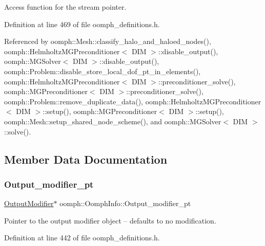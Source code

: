 Access function for the stream pointer. 



Definition at line 469 of file oomph\+\_\+definitions.\+h.



Referenced by oomph\+::\+Mesh\+::classify\+\_\+halo\+\_\+and\+\_\+haloed\+\_\+nodes(), oomph\+::\+Helmholtz\+M\+G\+Preconditioner$<$ D\+I\+M $>$\+::disable\+\_\+output(), oomph\+::\+M\+G\+Solver$<$ D\+I\+M $>$\+::disable\+\_\+output(), oomph\+::\+Problem\+::disable\+\_\+store\+\_\+local\+\_\+dof\+\_\+pt\+\_\+in\+\_\+elements(), oomph\+::\+Helmholtz\+M\+G\+Preconditioner$<$ D\+I\+M $>$\+::preconditioner\+\_\+solve(), oomph\+::\+M\+G\+Preconditioner$<$ D\+I\+M $>$\+::preconditioner\+\_\+solve(), oomph\+::\+Problem\+::remove\+\_\+duplicate\+\_\+data(), oomph\+::\+Helmholtz\+M\+G\+Preconditioner$<$ D\+I\+M $>$\+::setup(), oomph\+::\+M\+G\+Preconditioner$<$ D\+I\+M $>$\+::setup(), oomph\+::\+Mesh\+::setup\+\_\+shared\+\_\+node\+\_\+scheme(), and oomph\+::\+M\+G\+Solver$<$ D\+I\+M $>$\+::solve().



\subsection{Member Data Documentation}
\mbox{\label{classoomph_1_1OomphInfo_ae6763fdb47c1b4c6e40cba7d92d3b850}} 
\subsubsection{\texorpdfstring{Output\+\_\+modifier\+\_\+pt}{Output\_modifier\_pt}}
{\footnotesize\ttfamily \hyperlink{classoomph_1_1OutputModifier}{Output\+Modifier}$\ast$ oomph\+::\+Oomph\+Info\+::\+Output\+\_\+modifier\+\_\+pt\hspace{0.3cm}{\ttfamily [private]}}



Pointer to the output modifier object -- defaults to no modification. 



Definition at line 442 of file oomph\+\_\+definitions.\+h.

\mbox{\label{classoomph_1_1OomphInfo_a277eeb7e2fc0712f6bec0bd1516d738d}} 
